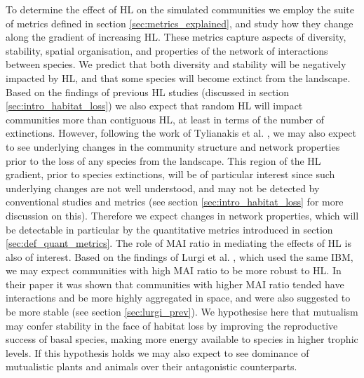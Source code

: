 To determine the effect of HL on the simulated communities we employ the suite of metrics defined in section \ref{sec:metrics_explained}, and study how they change along the gradient of increasing HL. These metrics capture aspects of diversity, stability, spatial organisation, and properties of the network of interactions between species. We predict that both diversity and stability will be negatively impacted by HL, and that  some species will become extinct from the landscape. Based on the findings of previous HL studies (discussed in section \ref{sec:intro_habitat_loss}) we also expect that random HL will impact communities more than contiguous HL, at least in terms of the number of extinctions. However, following the work of Tylianakis et al. \cite{tylianakis2007habitat}, we may also expect to see underlying changes in the community structure and network properties prior to the loss of any species from the landscape. This region of the HL gradient, prior to species extinctions, will be of particular interest since such underlying changes are not well understood, and may not be detected by conventional studies and metrics (see section \ref{sec:intro_habitat_loss} for more discussion on this). Therefore we expect changes in network properties, which will be detectable in particular by the quantitative metrics introduced in section \ref{sec:def_quant_metrics}.  The role of MAI ratio in mediating the effects of HL is also of interest. Based on the findings of Lurgi et al. \cite{lurgi2015effects}, which used the same IBM, we may expect communities with high MAI ratio to be more robust to HL. In their paper it was shown that communities with higher MAI ratio tended have  interactions and be more highly aggregated in space, and were also suggested to be more stable (see section \ref{sec:lurgi_prev}). We hypothesise here that mutualism may confer stability in the face of habitat loss by improving the reproductive success of basal species, making more energy available to species in higher trophic levels. If this hypothesis holds we may also expect to see dominance of mutualistic plants and animals over their antagonistic counterparts. 

